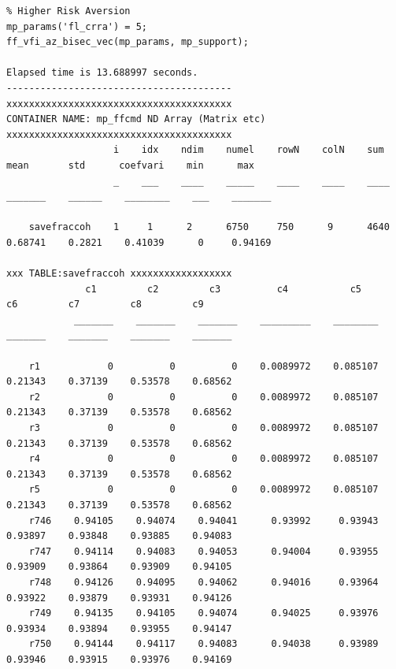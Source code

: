 \documentclass[
]{book}
\begin{document}
\begin{verbatim}
% Higher Risk Aversion
mp_params('fl_crra') = 5;
ff_vfi_az_bisec_vec(mp_params, mp_support);

Elapsed time is 13.688997 seconds.
----------------------------------------
xxxxxxxxxxxxxxxxxxxxxxxxxxxxxxxxxxxxxxxx
CONTAINER NAME: mp_ffcmd ND Array (Matrix etc)
xxxxxxxxxxxxxxxxxxxxxxxxxxxxxxxxxxxxxxxx
                   i    idx    ndim    numel    rowN    colN    sum      mean       std      coefvari    min      max  
                   _    ___    ____    _____    ____    ____    ____    _______    ______    ________    ___    _______

    savefraccoh    1     1      2      6750     750      9      4640    0.68741    0.2821    0.41039      0     0.94169

xxx TABLE:savefraccoh xxxxxxxxxxxxxxxxxx
              c1         c2         c3          c4           c5         c6         c7         c8         c9   
            _______    _______    _______    _________    ________    _______    _______    _______    _______

    r1            0          0          0    0.0089972    0.085107    0.21343    0.37139    0.53578    0.68562
    r2            0          0          0    0.0089972    0.085107    0.21343    0.37139    0.53578    0.68562
    r3            0          0          0    0.0089972    0.085107    0.21343    0.37139    0.53578    0.68562
    r4            0          0          0    0.0089972    0.085107    0.21343    0.37139    0.53578    0.68562
    r5            0          0          0    0.0089972    0.085107    0.21343    0.37139    0.53578    0.68562
    r746    0.94105    0.94074    0.94041      0.93992     0.93943    0.93897    0.93848    0.93885    0.94083
    r747    0.94114    0.94083    0.94053      0.94004     0.93955    0.93909    0.93864    0.93909    0.94105
    r748    0.94126    0.94095    0.94062      0.94016     0.93964    0.93922    0.93879    0.93931    0.94126
    r749    0.94135    0.94105    0.94074      0.94025     0.93976    0.93934    0.93894    0.93955    0.94147
    r750    0.94144    0.94117    0.94083      0.94038     0.93989    0.93946    0.93915    0.93976    0.94169
\end{verbatim}
\end{document}
